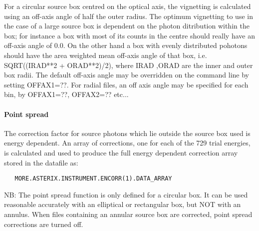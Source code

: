 \documentclass{book}
\renewcommand{\_}{{\tt\char'137}}     %
\begin{document}
For a circular source box centred on the optical axis, the vignetting
is calculated using an off-axis angle of half the outer radius. The
optimum vignetting to use in the case of a large source box is dependent
on the photon ditribution within the box; for instance a box with most
of its counts in the centre should really have an off-axis angle of 0.0.
On the other hand a box with evenly distributed pohotons should have the
area weighted mean off-axis angle of that box,
i.e. SQRT((IRAD**2 + ORAD**2)/2), where IRAD ,ORAD are the inner and outer
box radii. The default off-axis angle may be overridden on the command
line by setting OFFAX1=??. For radial files, an off axis angle may be
specified for each bin, by OFFAX1=??, OFFAX2=?? etc...

\paragraph{Point spread}
The correction factor for source photons which lie outside the source
box used is energy dependent. An array of corrections, one for each of
the 729 trial energies, is calculated and used to produce the full
energy dependent correction array stored in the datafile as:
\begin{verbatim}
   MORE.ASTERIX.INSTRUMENT.ENCORR(1).DATA_ARRAY
\end{verbatim}
NB: The point spread function is only defined for a circular box.
It can be used reasonable accurately with an elliptical or rectangular
box, but NOT with an annulus. When files containing an annular source
box are corrected, point spread corrections are turned off.
\end{document}
